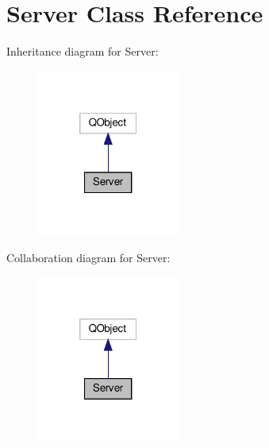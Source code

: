 \hypertarget{classServer}{}\section{Server Class Reference}
\label{classServer}


Inheritance diagram for Server\+:
\nopagebreak
\begin{figure}[H]
\begin{center}
\leavevmode
\includegraphics[width=133pt]{classServer__inherit__graph}
\end{center}
\end{figure}


Collaboration diagram for Server\+:
\nopagebreak
\begin{figure}[H]
\begin{center}
\leavevmode
\includegraphics[width=133pt]{classServer__coll__graph}
\end{center}
\end{figure}

